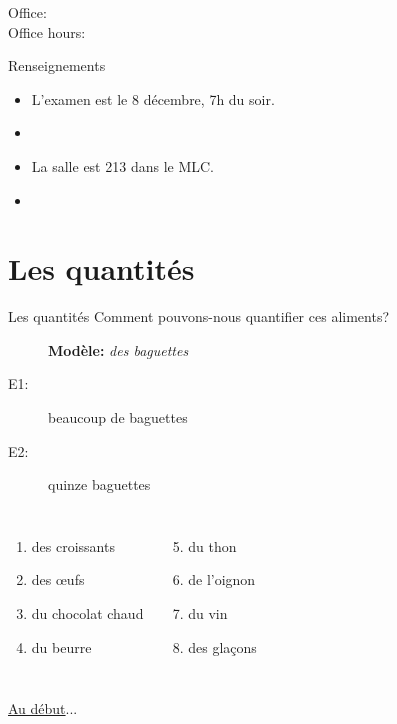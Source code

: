 \documentclass{beamer}
\subtitle[Révision: Dernier examen]{La révision pour le dernier examen}
\begin{document}
  \begin{frame}
    \titlepage
    \tiny{Office: \\
          Office hours: }
  \end{frame}

  \begin{frame}{Renseignements}
    \begin{itemize}
      \item L'examen est le 8 décembre, 7h du soir.
      \item[] 
      \item La salle est 213 dans le MLC.
      \item[] 
    \end{itemize}
  \end{frame}

  \begin{frame}
    \hypertarget{début}{}
    \tableofcontents[hideallsubsections]
  \end{frame}

  \section{Les quantités}
    \begin{frame}{Les quantités}
      Comment pouvons-nous quantifier ces aliments?
      \begin{description}
        \item[] \textbf{Modèle:} \emph{des baguettes}
        \item[E1:] beaucoup de baguettes
        \item[E2:] quinze baguettes
      \end{description}
      \begin{columns}
          \begin{enumerate}
            \item des croissants
            \item des œufs
            \item du chocolat chaud
            \item du beurre
          \end{enumerate}
          \begin{enumerate}
            \setcounter{enumi}{4}
            \item du thon
            \item de l'oignon
            \item du vin
            \item des glaçons
          \end{enumerate}
      \end{columns}
      \vspace{0.5cm}
      \hyperlink{début}{Au début}...
    \end{frame}
\end{document}
